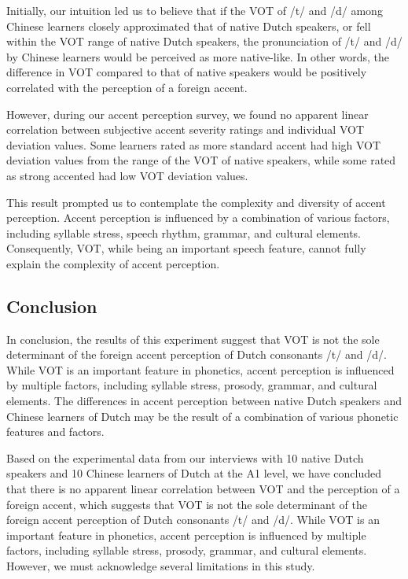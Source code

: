 \documentclass[runningheads]{llncs}
\begin{document}
Initially, our intuition led us to believe that if the VOT of /t/ and /d/ among Chinese learners closely approximated that of native Dutch speakers, or fell within the VOT range of native Dutch speakers, the pronunciation of /t/ and /d/ by Chinese learners would be perceived as more native-like. In other words, the difference in VOT compared to that of native speakers would be positively correlated with the perception of a foreign accent.

However, during our accent perception survey, we found no apparent linear correlation between subjective accent severity ratings and individual VOT deviation values. Some learners rated as more standard accent had high VOT deviation values from the range of the VOT of native speakers, while some rated as strong accented had low VOT deviation values. 

This result prompted us to contemplate the complexity and diversity of accent perception. Accent perception is influenced by a combination of various factors, including syllable stress, speech rhythm, grammar, and cultural elements. Consequently, VOT, while being an important speech feature, cannot fully explain the complexity of accent perception.


\subsection*{Conclusion}
In conclusion, the results of this experiment suggest that VOT is not the sole determinant of the foreign accent perception of Dutch consonants /t/ and /d/. While VOT is an important feature in phonetics, accent perception is influenced by multiple factors, including syllable stress, prosody, grammar, and cultural elements. The differences in accent perception between native Dutch speakers and Chinese learners of Dutch may be the result of a combination of various phonetic features and factors.

Based on the experimental data from our interviews with 10 native Dutch speakers and 10 Chinese learners of Dutch at the A1 level, we have concluded that there is no apparent linear correlation between VOT and the perception of a foreign accent, which suggests that VOT is not the sole determinant of the foreign accent perception of Dutch consonants /t/ and /d/. While VOT is an important feature in phonetics, accent perception is influenced by multiple factors, including syllable stress, prosody, grammar, and cultural elements.  However, we must acknowledge several limitations in this study.
\end{document}
